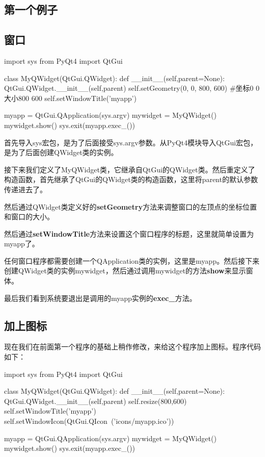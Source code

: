 \documentclass[12pt,oneside]{book}
\begin{document}
\begin{common-format}
\chapter{第一个例子}
\section{窗口}
\begin{tcbpython}
import sys
from PyQt4  import QtGui

class MyQWidget(QtGui.QWidget):
    def __init__(self,parent=None):
        QtGui.QWidget.__init__(self,parent)
        self.setGeometry(0, 0, 800, 600)
        #坐标0 0 大小800 600
        self.setWindowTitle('myapp')

myapp = QtGui.QApplication(sys.argv)
mywidget = MyQWidget()
mywidget.show()
sys.exit(myapp.exec_())
\end{tcbpython}

首先导入sys宏包，是为了后面接受sys.argv参数。从PyQt4模块导入QtGui宏包，是为了后面创建QWidget类的实例。

接下来我们定义了MyQWidget类，它继承自QtGui的QWidget类。然后重定义了构造函数，首先继承了QtGui的QWidget类的构造函数，这里将parent的默认参数传递进去了。

然后通过QWidget类定义好的\textbf{setGeometry}方法来调整窗口的左顶点的坐标位置和窗口的大小。

然后通过\textbf{setWindowTitle}方法来设置这个窗口程序的标题，这里就简单设置为myapp了。

任何窗口程序都需要创建一个QApplication类的实例，这里是myapp。然后接下来创建QWidget类的实例mywidget，然后通过调用mywidget的方法\textbf{show}来显示窗体。

最后我们看到系统要退出是调用的myapp实例的\textbf{exec\_}方法。


\section{加上图标}
现在我们在前面第一个程序的基础上稍作修改，来给这个程序加上图标。程序代码如下：
\begin{tcbpython}
import sys
from PyQt4  import QtGui

class MyQWidget(QtGui.QWidget):
    def __init__(self,parent=None):
        QtGui.QWidget.__init__(self,parent)
        self.resize(800,600)
        self.setWindowTitle('myapp')
        self.setWindowIcon(QtGui.QIcon\
        ('icons/myapp.ico'))


myapp = QtGui.QApplication(sys.argv)
mywidget = MyQWidget()
mywidget.show()
sys.exit(myapp.exec_())
\end{tcbpython}




\end{common-format}
\end{document}
